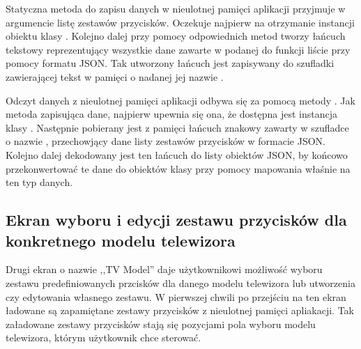 \documentclass[12pt,twoside]{article}
\begin{document}


Statyczna metoda do zapisu danych w nieulotnej pamięci aplikacji  przyjmuje w argumencie listę zestawów przycisków. Oczekuje najpierw na otrzymanie instancji obiektu klasy . Kolejno dalej przy pomocy odpowiednich metod tworzy łańcuch tekstowy  reprezentujący wszystkie dane zawarte w podanej do funkcji liście przy pomocy formatu JSON. Tak utworzony łańcuch jest zapisywany do szufladki zawierającej tekst w pamięci o nadanej jej nazwie .

Odczyt danych z nieulotnej pamięci aplikacji odbywa się za pomocą metody . Jak metoda zapisująca dane, najpierw upewnia się ona, że dostępna jest instancja klasy . Następnie pobierany jest z pamięci łańcuch znakowy zawarty w szufladce o nazwie , przechowjący dane listy zestawów przycisków w formacie JSON.
Kolejno dalej dekodowany jest ten łańcuch do listy obiektów JSON, by końcowo przekonwertować te dane do obiektów klasy  przy pomocy mapowania właśnie na ten typ danych.

\subsection{Ekran wyboru i edycji zestawu przycisków dla konkretnego modelu telewizora}
Drugi ekran o nazwie ,,TV Model'' daje użytkownikowi możliwość wyboru zestawu  predefiniowanych przcisków dla danego modelu telewizora lub utworzenia czy edytowania własnego zestawu. W pierwszej chwili po przejściu na ten ekran ładowane są zapamiętane zestawy przycisków z nieulotnej pamięci apliakacji. Tak załadowane zestawy przycisków stają się pozycjami pola wyboru modelu telewizora, którym użytkownik chce sterować. 
\end{document}
